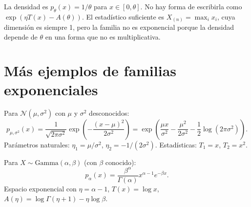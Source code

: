 \begin{example}
	La densidad es $p_\theta(x) = 1/\theta$ para $x \in [0, \theta]$.  No hay forma de escribirla como $\exp(\eta T(x) - A(\theta))$.  El estadístico suficiente es $X_{(n)} = \max_i x_i$, cuya dimensión es siempre 1, pero la familia no es exponencial porque la densidad depende de $\theta$ en una forma que no es multiplicativa.
\end{example}

\begin{center}
\end{center}

\section{Más ejemplos de familias exponenciales}

\begin{example}
	Para $\mathcal{N}(\mu, \sigma^2)$ con $\mu$ y $\sigma^2$ desconocidos:
	\[
	p_{\mu,\sigma^2}(x) = \frac{1}{\sqrt{2\pi\sigma^2}} \exp\!\left(-\frac{(x-\mu)^2}{2\sigma^2}\right)
	= \exp\!\left(\frac{\mu x}{\sigma^2} - \frac{\mu^2}{2\sigma^2} - \frac{1}{2}\log(2\pi\sigma^2)\right).
	\]
	Parámetros naturales: $\eta_1 = \mu/\sigma^2$, $\eta_2 = -1/(2\sigma^2)$.  Estadísticas: $T_1 = x$, $T_2 = x^2$.
\end{example}

\begin{example}[Gamma]
	Para $X \sim \mathrm{Gamma}(\alpha, \beta)$ (con $\beta$ conocido):
	\[
	p_\alpha(x) = \frac{\beta^\alpha}{\Gamma(\alpha)} x^{\alpha-1} e^{-\beta x}.
	\]
	Espacio exponencial con $\eta = \alpha - 1$, $T(x) = \log x$, $A(\eta) = \log\Gamma(\eta+1) - \eta\log\beta$.
\end{example}

